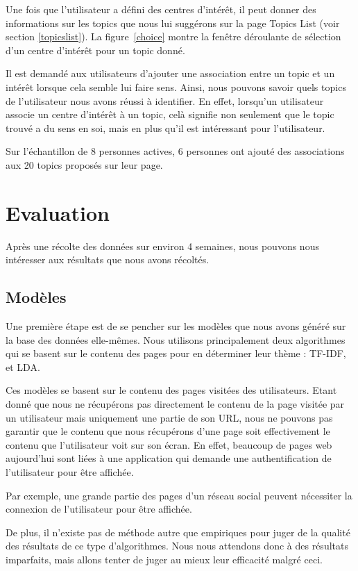			Une fois que l'utilisateur a défini des centres d'intérêt, il peut donner des informations sur les topics que nous lui suggérons sur la page Topics List (voir section \ref{topicslist}). La figure~\ref{choice} montre la fenêtre déroulante de sélection d'un centre d'intérêt pour un topic donné.

			Il est demandé aux utilisateurs d'ajouter une association entre un topic et un intérêt lorsque cela semble lui faire sens. Ainsi, nous pouvons savoir quels topics de l'utilisateur nous avons réussi à identifier. En effet, lorsqu'un utilisateur associe un centre d'intérêt à un topic, celà signifie non seulement que le topic trouvé a du sens en soi, mais en plus qu'il est intéressant pour l'utilisateur.

			Sur l'échantillon de 8 personnes actives, 6 personnes ont ajouté des associations aux 20 topics proposés sur leur page. 

\section{Evaluation}

	Après une récolte des données sur environ 4 semaines, nous pouvons nous intéresser aux résultats que nous avons récoltés.

	\subsection{Modèles}

		Une première étape est de se pencher sur les modèles que nous avons généré sur la base des données elle-mêmes. Nous utilisons principalement deux algorithmes qui se basent sur le contenu des pages pour en déterminer leur thème : TF-IDF, et LDA.

		Ces modèles se basent sur le contenu des pages visitées des utilisateurs. Etant donné que nous ne récupérons pas directement le contenu de la page visitée par un utilisateur mais uniquement une partie de son URL, nous ne pouvons pas garantir que le contenu que nous récupérons d'une page soit effectivement le contenu que l'utilisateur voit sur son écran. En effet, beaucoup de pages web aujourd'hui sont liées à une application qui demande une authentification de l'utilisateur pour être affichée.

		Par exemple, une grande partie des pages d'un réseau social peuvent nécessiter la connexion de l'utilisateur pour être affichée.

		De plus, il n'existe pas de méthode autre que empiriques pour juger de la qualité des résultats de ce type d'algorithmes. Nous nous attendons donc à des résultats imparfaits, mais allons tenter de juger au mieux leur efficacité malgré ceci.

